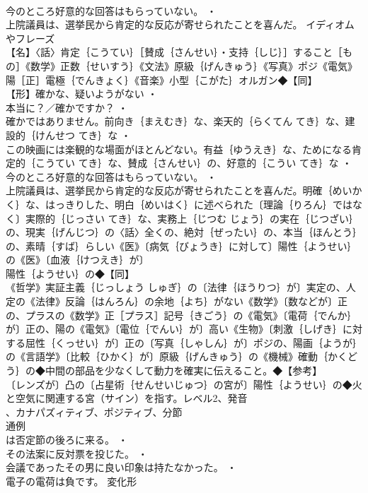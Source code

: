 \documentclass[8pt]{extreport}
\begin{document}
\begin{CJK}{UTF8}{min}
\\	今のところ好意的な回答はもらっていない。 ・
\\	上院議員は、選挙民から肯定的な反応が寄せられたことを喜んだ。	イディオムやフレーズ 
\\	【名】〈話〉肯定｛こうてい｝［賛成｛さんせい｝・支持｛しじ｝］すること［もの］《数学》正数｛せいすう｝《文法》原級｛げんきゅう｝《写真》ポジ《電気》陽［正］電極｛でんきょく｝《音楽》小型｛こがた｝オルガン◆【同】
\\	【形】確かな、疑いようがない ・
\\	本当に？／確かですか？ ・
\\	確かではありません。前向き｛まえむき｝な、楽天的｛らくてん てき｝な、建設的｛けんせつ てき｝な ・
\\	この映画には楽観的な場面がほとんどない。有益｛ゆうえき｝な、ためになる肯定的｛こうてい てき｝な、賛成｛さんせい｝の、好意的｛こうい てき｝な ・
\\	今のところ好意的な回答はもらっていない。 ・
\\	上院議員は、選挙民から肯定的な反応が寄せられたことを喜んだ。明確｛めいかく｝な、はっきりした、明白｛めいはく｝に述べられた〔理論｛りろん｝ではなく〕実際的｛じっさい てき｝な、実務上｛じつむ じょう｝の実在｛じつざい｝の、現実｛げんじつ｝の〈話〉全くの、絶対｛ぜったい｝の、本当｛ほんとう｝の、素晴｛すば｝らしい《医》〔病気｛びょうき｝に対して〕陽性｛ようせい｝の《医》〔血液｛けつえき｝が〕
\\	陽性｛ようせい｝の◆【同】
\\	《哲学》実証主義｛じっしょう しゅぎ｝の〔法律｛ほうりつ｝が〕実定の、人定の《法律》反論｛はんろん｝の余地｛よち｝がない《数学》〔数などが〕正の、プラスの《数学》正［プラス］記号｛きごう｝の《電気》〔電荷｛でんか｝が〕正の、陽の《電気》〔電位｛でんい｝が〕高い《生物》〔刺激｛しげき｝に対する屈性｛くっせい｝が〕正の〔写真｛しゃしん｝が〕ポジの、陽画｛ようが｝の《言語学》〔比較｛ひかく｝が〕原級｛げんきゅう｝の《機械》確動｛かくどう｝の◆中間の部品を少なくして動力を確実に伝えること。◆【参考】
\\	〔レンズが〕凸の〔占星術｛せんせいじゅつ｝の宮が〕陽性｛ようせい｝の◆火と空気に関連する宮（サイン）を指す。レベル2、発音
\\	、カナパズィティブ、ポジティブ、分節
\\	通例
\\	は否定節の後ろに来る。 ・
\\	その法案に反対票を投じた。 ・
\\	会議であったその男に良い印象は持たなかった。 ・
\\	電子の電荷は負です。	変化形 

\end{CJK}
\end{document}
